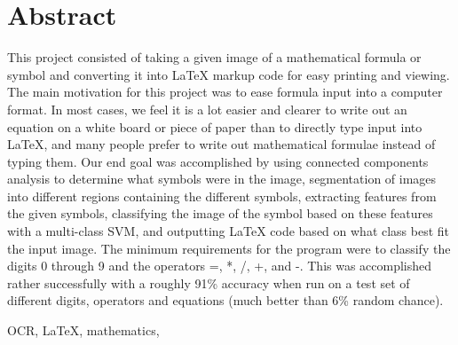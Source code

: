\section{Abstract}
This project consisted of taking a given image of a mathematical formula or symbol and converting it into LaTeX markup code for easy printing and viewing.  The main motivation for this project was to ease formula input into a computer format.  In most cases, we feel it is a lot easier and clearer to write out an equation on a white board or piece of paper than to directly type input into LaTeX, and many people prefer to write out mathematical formulae instead of typing them.  Our end goal was accomplished by using connected components analysis to determine what symbols were in the image, segmentation of images into different regions containing the different symbols, extracting features from the given symbols, classifying the image of the symbol based on these features with a multi-class SVM, and outputting LaTeX code based on what class best fit the input image.  The minimum requirements for the program were to classify the digits 0 through 9 and the operators =, *, /, +, and -.  This was accomplished rather successfully with a roughly 91\% accuracy when run on a test set of different digits, operators and equations (much better than 6\% random chance).

\begin{keywords}
OCR, LaTeX, mathematics, 
\end{keywords}